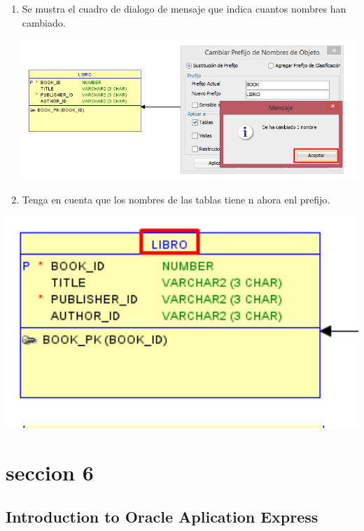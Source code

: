 \documentclass[12pt,letterpaper]{article}
\begin{document}
\begin{enumerate}[1.]
    \item Se mustra el cuadro de dialogo de mensaje que indica cuantos nombres han cambiado.  
    
    \includegraphics[width=15cm]{./giselaImagen/imagen11.png} 
    
    \item Tenga en cuenta que los nombres de las tablas tiene n ahora enl prefijo.  
		\end{enumerate}
		
		\includegraphics[width=15cm]{./giselaImagen/imagen12.png} 













 \newpage
 
\section{seccion 6 } 
\subsection{Introduction to Oracle Aplication Express}
\end{document}
